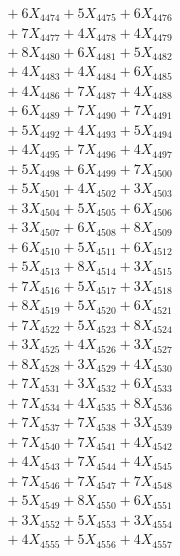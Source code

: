 \documentclass[a4paper,10pt]{article}
\begin{document}
{\begin{align}
&\;  + 6 X_{4474} + 5 X_{4475} + 6 X_{4476} \\[0.3ex]
&\;  + 7 X_{4477} + 4 X_{4478} + 4 X_{4479} \\[0.5ex]\allowbreak
&\;  + 8 X_{4480} + 6 X_{4481} + 5 X_{4482} \\[0.3ex]
&\;  + 4 X_{4483} + 4 X_{4484} + 6 X_{4485} \\[0.3ex]
&\;  + 4 X_{4486} + 7 X_{4487} + 4 X_{4488} \\[0.3ex]
&\;  + 6 X_{4489} + 7 X_{4490} + 7 X_{4491} \\[0.3ex]
&\;  + 5 X_{4492} + 4 X_{4493} + 5 X_{4494} \\[0.3ex]
&\;  + 4 X_{4495} + 7 X_{4496} + 4 X_{4497} \\[0.3ex]
&\;  + 5 X_{4498} + 6 X_{4499} + 7 X_{4500} \\[0.3ex]
&\;  + 5 X_{4501} + 4 X_{4502} + 3 X_{4503} \\[0.3ex]
&\;  + 3 X_{4504} + 5 X_{4505} + 6 X_{4506} \\[0.3ex]
&\;  + 3 X_{4507} + 6 X_{4508} + 8 X_{4509} \\[0.5ex]\allowbreak
&\;  + 6 X_{4510} + 5 X_{4511} + 6 X_{4512} \\[0.3ex]
&\;  + 5 X_{4513} + 8 X_{4514} + 3 X_{4515} \\[0.3ex]
&\;  + 7 X_{4516} + 5 X_{4517} + 3 X_{4518} \\[0.3ex]
&\;  + 8 X_{4519} + 5 X_{4520} + 6 X_{4521} \\[0.3ex]
&\;  + 7 X_{4522} + 5 X_{4523} + 8 X_{4524} \\[0.3ex]
&\;  + 3 X_{4525} + 4 X_{4526} + 3 X_{4527} \\[0.3ex]
&\;  + 8 X_{4528} + 3 X_{4529} + 4 X_{4530} \\[0.3ex]
&\;  + 7 X_{4531} + 3 X_{4532} + 6 X_{4533} \\[0.3ex]
&\;  + 7 X_{4534} + 4 X_{4535} + 8 X_{4536} \\[0.3ex]
&\;  + 7 X_{4537} + 7 X_{4538} + 3 X_{4539} \\[0.5ex]\allowbreak
&\;  + 7 X_{4540} + 7 X_{4541} + 4 X_{4542} \\[0.3ex]
&\;  + 4 X_{4543} + 7 X_{4544} + 4 X_{4545} \\[0.3ex]
&\;  + 7 X_{4546} + 7 X_{4547} + 7 X_{4548} \\[0.3ex]
&\;  + 5 X_{4549} + 8 X_{4550} + 6 X_{4551} \\[0.3ex]
&\;  + 3 X_{4552} + 5 X_{4553} + 3 X_{4554} \\[0.3ex]
&\;  + 4 X_{4555} + 5 X_{4556} + 4 X_{4557} \\[0.3ex]

\end{align}}
\end{document}
